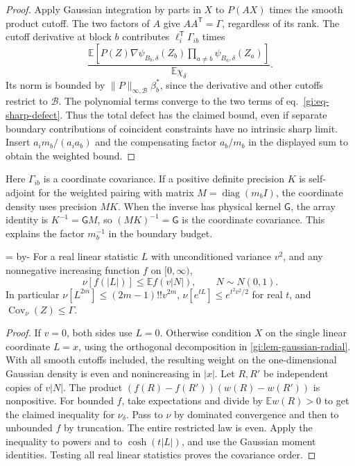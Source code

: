 \documentclass[11pt,letterpaper,reqno]{amsart}
\makeatletter
\numberwithin{equation}{section}
\renewcommand{\eqref}[1]{\textup{eq.~\ref{#1}}}
\newcommand{\gineedspace}[1]{\par\begingroup
  \dimen0=\pagegoal\advance\dimen0 by-\pagetotal
  \ifdim\dimen0<#1\relax\newpage\fi\endgroup}
\theoremstyle{definition}
\newcommand{\ms@majorstart}{%
  \pushQED{\qed}\renewcommand{\qedsymbol}{$\blacksquare\square$}}
\newenvironment{corollary}[1][]{\ms@majorstart\ms@corollary[#1]}
  {\popQED\endms@corollary}
\theoremstyle{remark}
\makeatother
\begin{document}
\begin{proof}
Apply Gaussian integration by parts in \(X\) to \(P(AX)\)
times the smooth product cutoff. The two factors of \(A\) give
\(AA^{\mathsf T}=\Gamma\), regardless of its rank. The cutoff
derivative at block \(b\) contributes
\(\ell_i^{\mathsf T}\Gamma_{ib}\) times
\[
 \frac{\mathbb E[P(Z)\nabla\psi_{B_b,\delta}(Z_b)
                    \prod_{a\ne b}\psi_{B_a,\delta}(Z_a)]}
           {\mathbb E\chi_\delta}.
\]
Its norm is bounded by \(\|P\|_{\infty,\mathcal B}\beta_b^*\),
since the derivative and other cutoffs restrict to \(\mathcal B\).
The polynomial terms converge to the two terms of
\eqref{gi:eq-sharp-defect}. Thus the total defect has the
claimed bound, even if separate boundary contributions of
coincident constraints have no intrinsic sharp limit.
Insert \(a_i m_b/(a_i a_b)\) and the compensating factor
\(a_b/m_b\) in the displayed sum to obtain the weighted bound.
\end{proof}

Here \(\Gamma_{ib}\) is a coordinate covariance. If a positive
definite precision \(K\) is self-adjoint for the weighted pairing with
matrix \(M=\operatorname{diag}(m_b I)\), the coordinate density
uses precision \(MK\). When the inverse has physical kernel
\(\mathsf G\), the array identity is \(K^{-1}=\mathsf G M\),
so \((MK)^{-1}=\mathsf G\) is the coordinate covariance.
This explains the factor \(m_b^{-1}\) in the boundary budget.

\gineedspace{9\baselineskip}
\begin{corollary}[Linear statistics under block restrictions]
\label{gi:cor-gaussian-cutoff-moments}
For a real linear statistic \(L\) with unconditioned variance \(v^2\),
and any nonnegative increasing function \(f\) on \([0,\infty)\),
\[
                \nu[f(|L|)]\le \mathbb E f(v|N|),
               \qquad N\sim N(0,1).
\]
In particular \(\nu[L^{2m}]\le(2m-1)!!v^{2m}\),
\(\nu[e^{tL}]\le e^{t^2v^2/2}\) for real \(t\), and
\(\operatorname{Cov}_{\nu}(Z)\le\Gamma\).
\end{corollary}

\begin{proof}
If \(v=0\), both sides use \(L=0\). Otherwise condition \(X\)
on the single linear coordinate \(L=x\), using the orthogonal
decomposition in \cref{gi:lem-gaussian-radial}. With all
smooth cutoffs included, the resulting weight on the
one-dimensional Gaussian density is even and nonincreasing in
\(|x|\). Let \(R,R'\) be independent copies of \(v|N|\).
The product \((f(R)-f(R'))(w(R)-w(R'))\) is nonpositive.
For bounded \(f\), take expectations and divide by
\(\mathbb E w(R)>0\) to get the claimed inequality for
\(\nu_\delta\). Pass to \(\nu\) by dominated convergence and
then to unbounded \(f\) by truncation. The entire restricted
law is even. Apply the inequality to powers and to
\(\cosh(t|L|)\), and use the Gaussian moment identities.
Testing all real linear statistics proves the covariance order.
\end{proof}
\end{document}
